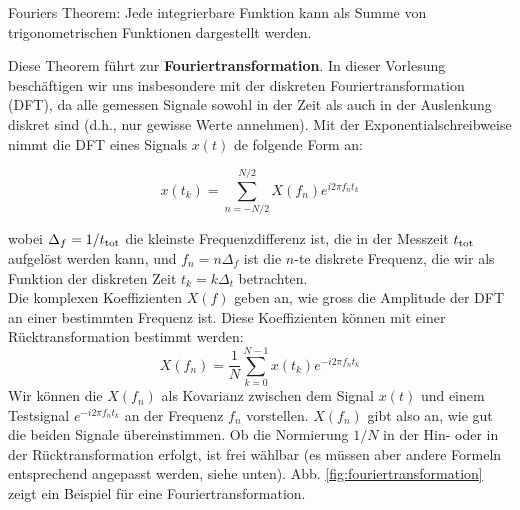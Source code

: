 \begin{center}
\begin{tcolorbox}[enhanced,width=6in,drop fuzzy shadow southwest,
    colframe=red!50!black,colback=red!05]
   Fouriers Theorem: Jede integrierbare Funktion kann als Summe von trigonometrischen Funktionen dargestellt werden.
\end{tcolorbox}
\end{center}


Diese Theorem führt zur \textbf{Fouriertransformation}. In dieser Vorlesung beschäftigen wir uns insbesondere mit der diskreten Fouriertransformation (DFT), da alle gemessen Signale sowohl in der Zeit als auch in der Auslenkung diskret sind (d.h., nur gewisse Werte annehmen). 
Mit der Exponentialschreibweise nimmt die DFT eines Signals $x(t)$ de folgende Form an: 

\begin{equation}
    x(t_k)= \sum_{n=-N/2}^{N/2} X(f_n) e^{i 2 \pi f_n t_k} 
\label{eq:vl7-1a}
\end{equation}

wobei $\Delta_f=1/t_\mathrm{tot}$ die kleinste Frequenzdifferenz ist, die in der Messzeit $t_\mathrm{tot}$ aufgelöst werden kann, und $f_n = n \Delta_f$ ist die $n$-te diskrete Frequenz, die wir als Funktion der diskreten Zeit $t_k = k\Delta_t$ betrachten. \\
Die komplexen Koeffizienten $X(f)$ geben an, wie gross die Amplitude der DFT an einer bestimmten Frequenz ist. Diese Koeffizienten können mit einer Rücktransformation bestimmt werden: 
\begin{equation}
    X(f_n)= \frac{1}{N}\sum_{k=0}^{N-1} x(t_k) e^{-i 2 \pi f_n t_k} 
\label{eq:vl7-1b}
\end{equation}
Wir können die $X(f_n)$ als Kovarianz zwischen dem Signal $x(t)$ und einem Testsignal $e^{-i 2 \pi f_n t_k}$ an der Frequenz $f_n$ vorstellen. $X(f_n)$ gibt also an, wie gut die beiden Signale übereinstimmen. Ob die Normierung $1/N$ in der Hin- oder in der Rücktransformation erfolgt, ist frei wählbar (es müssen aber andere Formeln entsprechend angepasst werden, siehe unten).
Abb. \ref{fig:fouriertransformation} zeigt ein Beispiel für eine Fouriertransformation.   \\

